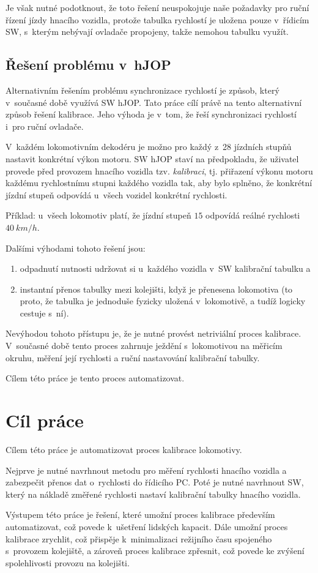 Je však nutné podotknout, že toto řešení neuspokojuje naše požadavky pro
ruční řízení jízdy hnacího vozidla, protože tabulka rychlostí je uložena
pouze v~řídicím SW, s~kterým nebývají ovladače propojeny, takže nemohou tabulku
využít.

\subsection{Řešení problému v~hJOP}

Alternativním řešením problému synchronizace rychlostí je způsob, který
v~současné době využívá SW hJOP. Tato práce cílí právě na tento alternativní
způsob řešení kalibrace. Jeho výhoda je v~tom, že řeší synchronizaci
rychlostí i~pro ruční ovladače.

V~každém lokomotivním dekodéru je možno pro každý z~28 jízdních stupňů nastavit
konkrétní výkon motoru. SW hJOP staví na předpokladu, že uživatel provede před
provozem hnacího vozidla tzv. \textit{kalibraci}, tj. přiřazení výkonu motoru
každému rychlostnímu stupni každého vozidla tak, aby bylo splněno, že konkrétní
jízdní stupeň odpovídá u~všech vozidel konkrétní rychlosti.

Příklad: u~všech lokomotiv platí, že jízdní stupeň $15$ odpovídá reálné
rychlosti $40\ km/h$.

Dalšími výhodami tohoto řešení jsou:

\begin{enumerate}
	\item odpadnutí nutnosti udržovat si u~každého vozidla v~SW kalibrační
	tabulku a
	\item instantní přenos tabulky mezi kolejišti, když je přenesena
	lokomotiva (to proto, že tabulka je jednoduše fyzicky uložená v~lokomotivě,
	a tudíž logicky cestuje s~ní).
\end{enumerate}

Nevýhodou tohoto přístupu je, že je nutné provést netriviální proces kalibrace.
V~současné době tento proces zahrnuje ježdění s~lokomotivou na měřicím okruhu,
měření její rychlosti a ruční nastavování kalibrační tabulky.

Cílem této práce je tento proces automatizovat.

\section{Cíl práce}

Cílem této práce je automatizovat proces kalibrace lokomotivy.

Nejprve je nutné navrhnout metodu pro měření rychlosti hnacího vozidla a
zabezpečit přenos dat o~rychlosti do řídicího PC. Poté je nutné navrhnout SW,
který na nákladě změřené rychlosti nastaví kalibrační tabulky hnacího vozidla.

Výstupem této práce je řešení, které umožní proces kalibrace především
automatizovat, což povede k~ušetření lidských kapacit. Dále umožní proces
kalibrace zrychlit, což přispěje k~minimalizaci režijního času spojeného
s~provozem kolejiště, a zároveň proces kalibrace zpřesnit, což povede ke
zvýšení spolehlivosti provozu na kolejišti.
